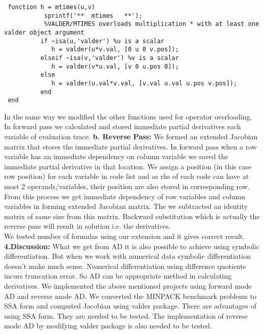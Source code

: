 \documentclass[paper=letter, fontsize=12pt]{scrartcl} %
\begin{document}
\begin{lstlisting}
 function h = mtimes(u,v)
           sprintf('**  mtimes   **');
           %VALDER/MTIMES overloads multiplication * with at least one valder object argument
          if ~isa(u,'valder') %u is a scalar
 			 h = valder(u*v.val, [0 u 0 v.pos]);
          elseif ~isa(v,'valder') %v is a scalar
             h = valder(v*u.val, [v 0 u.pos 0]);
          else
 	         h = valder(u.val*v.val, [v.val u.val u.pos v.pos]);
          end
 end 
\end{lstlisting}
In the same way we modified the other functions used for operator overloading. In forward pass we calculated and stored immediate partial derivatives each variable of evaluation trace. 
\newline
\newpage
\textbf{b. Reverse Pass: }
We formed an extended Jacobian matrix that stores the immediate partial derivatives. In forward pass when a row variable has an immediate dependency on column variable we saved the immediate partial derivative in that location. We assign a position (in this case row position) for each variable in code list and as rhs of each code can have at most 2 operands/variables, their position are also stored in corresponding row. From this process we get immediate dependency of row variables and column variables in forming extended Jacobian matrix. The we subtracted an identity matrix of same size from this matrix. Backward substitution which is actually the reverse pass will result in solution i.e. the derivatives.\\
We tested number of formulas using our extension and it gives correct result.\\  
\linebreak
\Large \textbf{4.Discussion:}
\normalsize
\newline
What we get from AD it is also possible to achieve using symbolic differentiation. But when we work with numerical data symbolic differentiation doesn't make much sense. Numerical differentiation using difference quotients incurs truncation error. So AD can be appropriate method in calculating derivatives. We implemented the above mentioned projects using forward mode AD and reverse mode AD.  We converted the MINPACK benchmark problems to SSA form and computed Jacobian using valder package. There are advantages of using SSA form. They are needed to be tested. The implementation of reverse mode AD by modifying valder package is also needed to be tested. 
\end{document}
